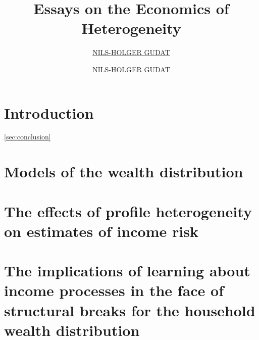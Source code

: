 \documentclass[oneside,12pt,a4paper]{Classes/CUEDthesisPSnPDF}
\title{Essays on the Economics of Heterogeneity}
\author{\href{}{NILS-HOLGER GUDAT}}
\author{NILS-HOLGER GUDAT}
\begin{document}







\begin{abstractslong}

\end{abstractslong}

\setcounter{secnumdepth}{2} %
\setcounter{tocdepth}{1}

\begin{spacing}{1.3}
  \tableofcontents
\end{spacing}

\begin{spacing}{1.5}
	\listoftables
	\listoffigures
\end{spacing}

\chapter{Introduction} %
 \ref{sec:conclusion}

\chapter{Models of the wealth distribution} %


\chapter{The effects of profile heterogeneity on estimates of income risk} 


\chapter{The implications of learning about income processes in the face of structural breaks for the household wealth distribution} 

\end{document}
